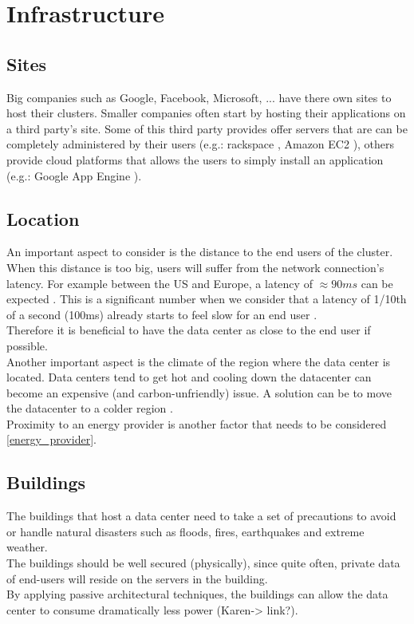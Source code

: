 \documentclass[12pt]{report}
\begin{document}
\section{Infrastructure}
\subsection{Sites}
Big companies such as Google, Facebook, Microsoft, ... have there own
sites to host their clusters. Smaller companies often start by hosting
their applications on a third party's site. Some of this third party
provides offer servers that are can be completely administered by their
users (e.g.: rackspace \cite{rackspace}, Amazon EC2 \cite{amazon_ec2}), others provide cloud
platforms that allows the users to simply install an application
(e.g.: Google App Engine \cite{google_app_engine}).

\subsection{Location}
An important aspect to consider is the distance to the end users of
the cluster. When this distance is too big, users will suffer from the
network connection's latency. For example between the US
and Europe, a latency of $\approx 90ms$ can be expected
\cite{verizon_latency}.
This is a significant number when we consider that a latency of 1/10th
of a second (100ms) already starts to feel slow for an end user 
\cite{web_app_latency}.\\
Therefore it is beneficial to have the data center as close to the end
user if possible.\\

Another important aspect is the climate of the region where the data
center is located. Data centers tend to get hot and cooling down the
datacenter can become an expensive (and carbon-unfriendly) issue.
A solution can be to move the datacenter to a colder region 
\cite{datacenter_cold}.\\

Proximity to an energy provider is another factor that needs to be
considered \ref{energy_provider}.

\subsection{Buildings}
The buildings that host a data center need to take a set of precautions to
avoid or handle natural disasters such as floods, fires, earthquakes
and extreme weather.\\
The buildings should be well secured (physically), since quite often, 
private data of end-users will reside on the servers in the
building.\\
By applying passive architectural techniques, the buildings can allow
the data center to consume dramatically less power (Karen-> link?).
 
\end{document}
